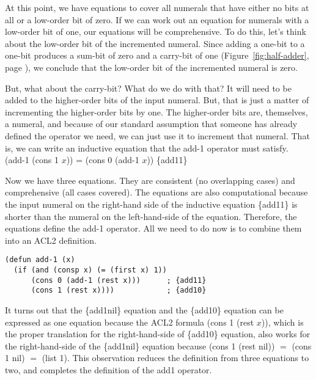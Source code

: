 At this point, we have equations to cover all numerals
that have either no bits at all or a low-order bit
of zero. If we can work out an equation for numerals
with a low-order bit of one, our equations will be comprehensive.
To do this, let's think about the
low-order bit of the incremented numeral.
Since adding a one-bit to a one-bit produces a sum-bit
of zero and a carry-bit of one
(Figure~\ref{fig:half-adder}, page \pageref{fig:half-adder}),
we conclude that the low-order bit of the incremented numeral
is zero.

But, what about the carry-bit? What do we do with that?
It will need to be added to the higher-order bits of
the input numeral. But, that is just a matter of incrementing
the higher-order bits by one.
The higher-order bits are, themselves, a numeral,
and because of our standard assumption that
someone has already defined the operator we need,
we can just use it to increment that numeral.
That is, we can write an inductive equation that the add-1 operator
must satisfy.
\\
\vspace{2mm}
\hspace*{2cm}
(add-1 (cons 1 $x$)) = (cons 0 (add-1 $x$))   \hfill \{add11\}

Now we have three equations.
They are consistent (no overlapping cases) and
comprehensive (all cases covered).
The equations are also computational because the input numeral
on the right-hand side of the inductive equation 
\{add11\} is shorter than
the numeral on the left-hand-side of the equation.
Therefore, the equations define the add-1 operator.
All we need to do now is to combine them into an ACL2 definition.

\label{add-1-defun}
\begin{Verbatim}
(defun add-1 (x)
  (if (and (consp x) (= (first x) 1))
      (cons 0 (add-1 (rest x)))      ; {add11}
      (cons 1 (rest x))))            ; {add10}
\end{Verbatim}

It turns out that the \{add1nil\} equation
and the \{add10\} equation can be expressed as one equation because
the ACL2 formula (cons 1 (rest $x$)), which is the proper
translation for the right-hand-side of \{add10\} equation,
also works for the right-hand-side of the \{add1nil\} equation
because (cons 1 (rest nil)) $=$ (cons 1 nil) $=$ (list 1).
This observation reduces the definition from three equations to two,
and completes the definition of the add1 operator.

